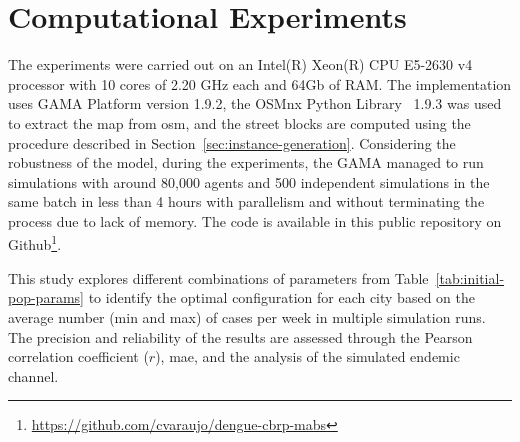 \section{Computational Experiments} \label{sec:computational-experiments}

The experiments were carried out on an Intel(R) Xeon(R)  CPU E5-2630 v4  processor with 10 cores of 2.20 GHz each and 64Gb of RAM. The implementation uses GAMA Platform version 1.9.2, the OSMnx Python Library~\citep{boeing:2017} 1.9.3 was used to extract the map from \gls{osm}, and the street blocks are computed using the procedure described in Section~\ref{sec:instance-generation}. Considering the robustness of the model, during the experiments, the GAMA managed to run simulations with around 80,000 agents and 500 independent simulations in the same batch in less than 4 hours with parallelism and without terminating the process due to lack of memory.
The code is available in this public repository on Github\footnote{\url{https://github.com/cvaraujo/dengue-cbrp-mabs}}.

This study explores different combinations of parameters from Table~\ref{tab:initial-pop-params} to identify the optimal configuration for each city based on the average number (min and max) of cases per week in multiple simulation runs. The precision and reliability of the results are assessed through the Pearson correlation coefficient ($r$), \gls{mae}, and the analysis of the simulated endemic channel.

\begin{table}[ht!]
\centering
\caption{Parameters for the initial state of the simulation.}
\label{tab:initial-pop-params}
\end{table}

